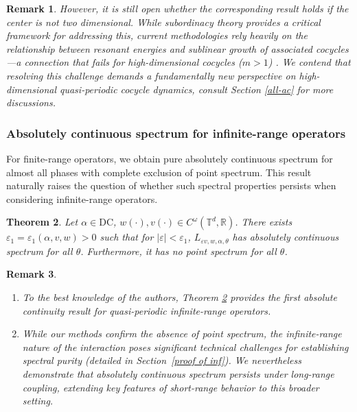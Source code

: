 \documentclass[11pt]{amsart}
\newtheorem{theorem}{Theorem}[section]
\newtheorem{rem}[theorem]{Remark}
\theoremstyle{remark}
\theoremstyle{definition}
\begin{document}
\begin{rem}
However, it is still open whether the corresponding result holds if the center is not two dimensional. 
While subordinacy theory provides a critical framework for addressing this, current methodologies \cite{Avila: ac,Eli92} rely heavily on the relationship between resonant energies and sublinear growth of associated cocycles—a connection that fails for high-dimensional cocycles (\(m > 1\)) \cite{WXYZ}. 
 We contend that resolving this challenge demands a fundamentally new perspective on high-dimensional quasi-periodic cocycle dynamics, consult Section \ref{all-ac} for more discussions.
\end{rem}


 

 \subsubsection{Absolutely continuous spectrum for infinite-range operators}

For finite-range operators, we obtain pure absolutely continuous spectrum for almost all phases with complete exclusion of point spectrum. This result naturally raises the question of whether such spectral properties persists when considering infinite-range operators.


\begin{theorem}\label{acqq}
Let  $\alpha \in \mathrm{DC}$,  $w(\cdot), v(\cdot)\in C^\omega(\mathbb{T}^d, \mathbb{R})$. There exists $\varepsilon_1= \varepsilon_1(\alpha,v,w) > 0$ such that for $|\varepsilon| < \varepsilon_1$,  
 $L_{\varepsilon v, w, \alpha, \theta}$ has absolutely continuous spectrum for all $\theta$. Furthermore, it has no point spectrum for all $\theta$.
\end{theorem}

\begin{rem}
\begin{enumerate}
    \item To the best knowledge of the authors, Theorem \ref{acqq} provides the first absolute continuity result for quasi-periodic infinite-range operators. 
    \item While our methods confirm the absence of point spectrum, the infinite-range nature of the interaction poses significant technical challenges for establishing spectral purity (detailed in Section~\ref{proof of inf}). We nevertheless demonstrate that absolutely continuous spectrum persists under long-range coupling, extending key features of short-range behavior to this broader setting.
\end{enumerate}
    
\end{rem}
    
\end{document}
